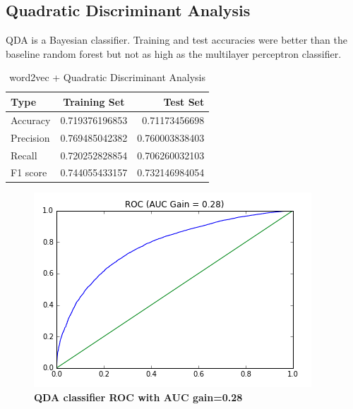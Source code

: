 \documentclass{sig-alternate-05-2015}
\begin{document}
		\subsection{Quadratic Discriminant Analysis}
	QDA is a Bayesian classifier. Training and test accuracies were better than the baseline random forest but not as high as the multilayer perceptron classifier. 
	\begin{table}[h!]
		\begin{center}
			\caption{word2vec + Quadratic Discriminant Analysis}
			\label{tab:table1}
			\begin{tabular}{l|c|r} %
				\textbf{Type} & \textbf{Training Set} & \textbf{Test Set}\\
				\hline
				Accuracy & 0.719376196853 & 0.71173456698 \\
				Precision & 0.769485042382 & 0.760003838403 \\
				Recall & 0.720252828854  & 0.706260032103\\
				F1 score & 0.744055433157 & 0.732146984054
			\end{tabular}
		\end{center}
	\end{table}
	
	\begin{figure}[H]
		\centering\includegraphics[scale=0.55]{ROC_qda} 
		\caption{\textbf{QDA classifier ROC with AUC gain=0.28 }}
	\end{figure}
	
\end{document}
